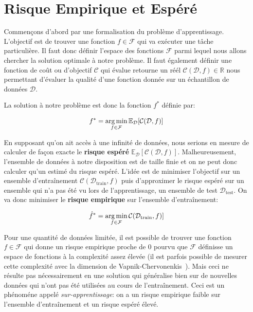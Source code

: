 \section{Risque Empirique et Espéré}

Commençons d'abord par une formalisation du problème d'apprentissage.
L'objectif est de trouver une fonction $f\in\mathcal{F}$ qui va exécuter une
tâche particulière. Il faut donc définir l'espace des fonctions $\mathcal{F}$
parmi lequel nous allons chercher la solution optimale à notre problème.  Il
faut également définir une fonction de coût ou d'objectif $\mathcal{C}$ qui
évalue retourne un réél $\mathcal{C}(\mathcal{D},f)\in\mathbb{R}$ nous
permettant d'évaluer la qualité d'une fonction donnée sur un échantillon de
données $\mathcal{D}$.

La solution à notre problème est donc la fonction $f^*$ définie par:

\begin{equation}
\label{eq:graal}
f^* = \operatorname*{arg\,min}_{f \in \mathcal{F}} {\mathbb E}_\mathcal{D}[\mathcal{C}(\mathcal{D},f)]
\end{equation}


En supposant qu'on ait accès à une infinité de données, nous serions en mesure
de calculer de façon exacte le {\bf risque espéré} ${\mathbb
E}_\mathcal{D}[\mathcal{C}(\mathcal{D},f)]$. Malheureusement, l'ensemble de
données à notre disposition est de taille finie et on ne peut donc calculer qu'un estimé
du risque espéré. L'idée est de minimiser l'objectif sur un ensemble d'entraînement
$\mathcal{C}(\mathcal{D}_\textrm{train},f)$ puis d'approximer le risque espéré sur un ensemble
qui n'a pas été vu lors de l'apprentissage, un ensemble de test
$\mathcal{D}_\textrm{test}$. On va donc minimiser le {\bf risque empirique} sur
l'ensemble d'entraînement:

\begin{equation}
\label{eq:graal}
\hat{f}^* = \operatorname*{arg\,min}_{f \in \mathcal{F}} \mathcal{C}(\mathcal{D}_\textrm{train},f)]
\end{equation}

Pour une quantité de données limitée, il est possible de trouver une fonction
$f\in\mathcal{F}$ qui donne un risque empirique proche de $0$ pourvu que
$\mathcal{F}$ définisse un espace de fonctions à la complexité assez élevée (il
est parfois possible de mesurer cette complexité avec la dimension de
Vapnik-Chervonenkis~\citep{Vapnik71}). Mais ceci ne résulte pas nécessairement en une solution
qui généralise bien sur de nouvelles données qui n'ont pas été utilisées au
cours de l'entraînement. Ceci est un phénoméne appelé \emph{sur-apprentissage}:
on a un risque empirique faible sur l'ensemble d'entraînement et un risque
espéré élevé. 

